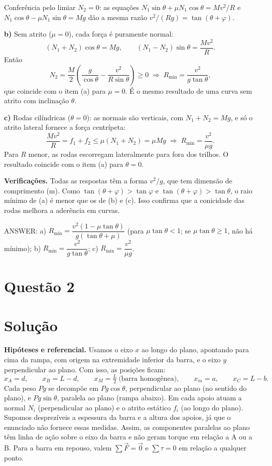 \documentclass{article}%
\begin{document}
Conferência pelo limiar $N_2=0$: as equações $N_1\sin\theta+\mu N_1\cos\theta=Mv^2/R$ e $N_1\cos\theta-\mu N_1\sin\theta=Mg$ dão a mesma razão $v^2/(Rg)=\tan(\theta+\varphi)$.

\textbf{b)} Sem atrito ($\mu=0$), cada força é puramente normal:
\[
(N_1+N_2)\cos\theta=Mg,\qquad (N_1-N_2)\sin\theta=\frac{Mv^2}{R}.
\]
Então
\[
N_2=\frac{M}{2}\left(\frac{g}{\cos\theta}-\frac{v^2}{R\sin\theta}\right)\ge 0
\;\Longrightarrow\;
R_{\min}=\frac{v^2}{g\tan\theta},
\]
que coincide com o item (a) para $\mu=0$. É o mesmo resultado de uma curva sem atrito com inclinação $\theta$.

\textbf{c)} Rodas cilíndricas ($\theta=0$): as normais são verticais, com $N_1+N_2=Mg$, e só o atrito lateral fornece a força centrípeta:
\[
\frac{Mv^2}{R}=f_1+f_2\le \mu(N_1+N_2)=\mu Mg
\;\Longrightarrow\;
R_{\min}=\frac{v^2}{\mu g}.
\]
Para $R$ menor, as rodas escorregam lateralmente para fora dos trilhos. O resultado coincide com o item (a) para $\theta=0$.

\textbf{Verificações.} Todas as respostas têm a forma $v^2/g$, que tem dimensão de comprimento (m). Como $\tan(\theta+\varphi)>\tan\varphi$ e $\tan(\theta+\varphi)>\tan\theta$, o raio mínimo de (a) é menor que os de (b) e (c). Isso confirma que a conicidade das rodas melhora a aderência em curvas.

\medskip
ANSWER: a) $R_{\min}=\dfrac{v^2(1-\mu\tan\theta)}{g(\tan\theta+\mu)}$ (para $\mu\tan\theta<1$; se $\mu\tan\theta\ge1$, não há mínimo); b) $R_{\min}=\dfrac{v^2}{g\tan\theta}$; c) $R_{\min}=\dfrac{v^2}{\mu g}$.%
\newpage%
\section*{Questão 2}

\section*{Solução}

\textbf{Hipóteses e referencial.} Usamos o eixo $x$ ao longo do plano, apontando para cima da rampa, com origem na extremidade inferior da barra, e o eixo $y$ perpendicular ao plano. Com isso, as posições ficam:
\[
x_A=d,\qquad x_B=L-d,\qquad x_M=\tfrac{L}{2}\ \text{(barra homogênea)},\qquad x_m=a,\qquad x_{C}=L-b .
\]
Cada peso $Pg$ se decompõe em $Pg\cos\theta$, perpendicular ao plano (no sentido do plano), e $Pg\sin\theta$, paralela ao plano (rampa abaixo). Em cada apoio atuam a normal $N_i$ (perpendicular ao plano) e o atrito estático $f_i$ (ao longo do plano). Supomos desprezíveis a espessura da barra e a altura dos apoios, já que o enunciado não fornece essas medidas. Assim, as componentes paralelas ao plano têm linha de ação sobre o eixo da barra e não geram torque em relação a A ou a B. Para a barra em repouso, valem $\sum\vec F=\vec 0$ e $\sum\tau=0$ em relação a qualquer ponto.
\end{document}
